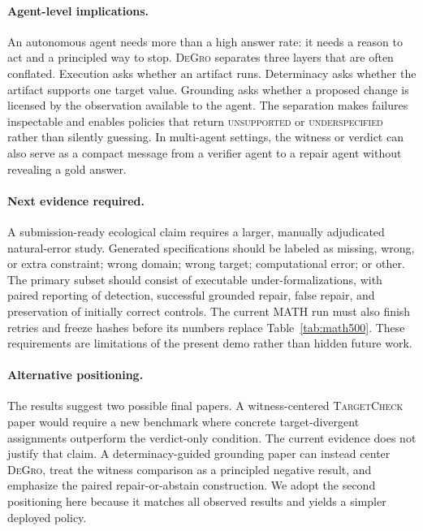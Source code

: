 \documentclass[sigconf,anonymous]{aamas}
\newcommand{\method}{\textsc{DeGro}}
\newcommand{\tc}{\textsc{TargetCheck}}
\begin{document}
\paragraph{Agent-level implications.}
An autonomous agent needs more than a high answer rate: it needs a reason to act and a principled way to stop.  \method{} separates three layers that are often conflated.  Execution asks whether an artifact runs.  Determinacy asks whether the artifact supports one target value.  Grounding asks whether a proposed change is licensed by the observation available to the agent.  The separation makes failures inspectable and enables policies that return \textsc{unsupported} or \textsc{underspecified} rather than silently guessing.  In multi-agent settings, the witness or verdict can also serve as a compact message from a verifier agent to a repair agent without revealing a gold answer.

\paragraph{Next evidence required.}
A submission-ready ecological claim requires a larger, manually adjudicated natural-error study.  Generated specifications should be labeled as missing, wrong, or extra constraint; wrong domain; wrong target; computational error; or other.  The primary subset should consist of executable under-formalizations, with paired reporting of detection, successful grounded repair, false repair, and preservation of initially correct controls.  The current MATH run must also finish retries and freeze hashes before its numbers replace Table~\ref{tab:math500}.  These requirements are limitations of the present demo rather than hidden future work.

\paragraph{Alternative positioning.}
The results suggest two possible final papers.  A witness-centered \tc{} paper would require a new benchmark where concrete target-divergent assignments outperform the verdict-only condition.  The current evidence does not justify that claim.  A determinacy-guided grounding paper can instead center \method{}, treat the witness comparison as a principled negative result, and emphasize the paired repair-or-abstain construction.  We adopt the second positioning here because it matches all observed results and yields a simpler deployed policy.
\end{document}
